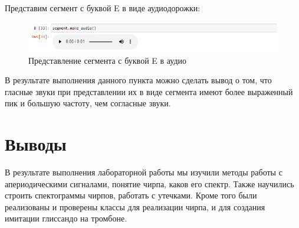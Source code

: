 \documentclass[a4paper]{article}
\begin{document}
            Представим сегмент с буквой E в виде аудиодорожки:
            
            \begin{figure}[H]
                \centering
                \includegraphics[width=\textwidth]{ex_6_letter_e_audio.png}
                \caption{Представление сегмента с буквой E в аудио}
                \label{fig:ex_6_letter_e_audio}
            \end{figure}
            
            В результате выполнения данного пункта можно сделать вывод о том, что гласные звуки при представлении их в виде сегмента имеют более выраженный пик и большую частоту, чем согласные звуки. 
            
    \newpage
        \section{Выводы}
             В результате выполнения лабораторной работы мы изучили методы работы с апериодическими сигналами, понятие чирпа, каков его спектр. Также научились строить спектограммы чирпов, работать с утечками. Кроме того были реализованы и проверены классы для реализации чирпа, и для создания имитации глиссандо на тромбоне. 
           
\end{document}
